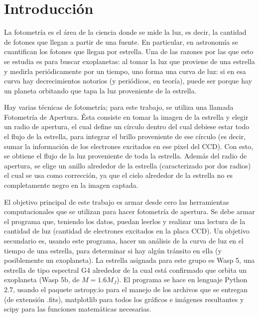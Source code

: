 \documentclass[a4paper, 11pt, spanish]{article}
\begin{document}
\newpage

\tableofcontents %
\listoffigures %

\newpage

\section{Introducci\'on}
La fotometr\'ia es el \'area de la ciencia donde se mide la luz, es decir, la cantidad de fotones que llegan a partir de una fuente. En particular, en astronom\'ia se cuantifican los fotones que llegan por estrella. Una de las razones por las que esto se estudia es para buscar exoplanetas: al tomar la luz que proviene de una estrella y medirla peri\'odicamente por un tiempo, uno forma una curva de luz: si en esa curva hay decrecimientos notorios (y peri\'odicos, en teor\'ia), puede ser porque hay un planeta orbitando que tapa la luz proveniente de la estrella. 

Hay varias t\'ecnicas de fotometr\'ia; para este trabajo, se utiliza una llamada Fotometr\'ia de Apertura. \'Esta consiste en tomar la imagen de la estrella y elegir un radio de apertura, el cual define un c\'irculo dentro del cual debiese estar todo el flujo de la estrella, para integrar el brillo proveniente de ese c\'irculo (es decir, sumar la informaci\'on de los electrones excitados en ese pixel del CCD). Con esto, se obtiene el flujo de la luz proveniente de toda la estrella. Adem\'as del radio de apertura, se elige un anillo alrededor de la estrella (caracterizado por dos radios) el cual se usa como correcci\'on, ya que el cielo alrededor de la estrella no es completamente negro en la imagen captada.


El objetivo principal de este trabajo es armar desde cero las herramientas computacionales que se utilizan para hacer fotometr\'ia de apertura. Se debe armar el programa que, teniendo los datos, puedan leerlos y realizar una lectura de la cantidad de luz (cantidad de electrones excitados en la placa CCD). Un objetivo secundario es, usando este programa, hacer un an\'alisis de la curva de luz en el tiempo de una estrella, para determinar si hay alg\'un tr\'ansito en ella (y posiblemente un exoplaneta). La estrella asignada para este grupo es Wasp 5, una estrella de tipo espectral G4 alrededor de la cual est\'a confirmado que orbita un exoplaneta (Wasp 5b, de $M=1.6M_J$). El programa se hace en lenguaje Python 2.7, usando el paquete astropy.io para el manejo de los archivos que se entregan (de extensi\'on .fits), matplotlib para todos los gr\'aficos e im\'agenes resultantes y scipy para las funciones matem\'aticas necesarias. 
\end{document}
